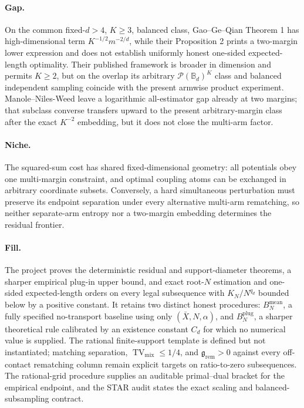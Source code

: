 \documentclass{article}
\begin{document}
\paragraph{Gap.} On the common fixed-\(d>4\), \(K\ge3\), balanced class, Gao--Ge--Qian Theorem 1 has high-dimensional term \(K^{-1/2}m^{-2/d}\), while their Proposition 2 prints a two-margin lower expression and does not establish uniformly honest one-sided expected-length optimality.  Their published framework is broader in dimension and permits \(K\ge2\), but on the overlap its arbitrary \(\mathcal P(\mathbb B_d)^K\) class and balanced independent sampling coincide with the present armwise product experiment.  Manole--Niles-Weed leave a logarithmic all-estimator gap already at two margins; that subclass converse transfers upward to the present arbitrary-margin class after the exact \(K^{-2}\) embedding, but it does not close the multi-arm factor.

\paragraph{Niche.} The squared-sum cost has shared fixed-dimensional geometry: all potentials obey one multi-margin constraint, and optimal coupling atoms can be exchanged in arbitrary coordinate subsets.  Conversely, a hard simultaneous perturbation must preserve its endpoint separation under every alternative multi-arm rematching, so neither separate-arm entropy nor a two-margin embedding determines the residual frontier.

\paragraph{Fill.} The project proves the deterministic residual and support-diameter theorems, a sharper empirical plug-in upper bound, and exact root-\(N\) estimation and one-sided expected-length orders on every legal subsequence with \(K_N/N^{q_d}\) bounded below by a positive constant.  It retains two distinct honest procedures: \(B_N^{\mathrm{mean}}\), a fully specified no-transport baseline using only \((\bar X,N,\alpha)\), and \(B_N^{\mathrm{plug}}\), a sharper theoretical rule calibrated by an existence constant \(C_d\) for which no numerical value is supplied.  The rational finite-support template is defined but not instantiated; matching separation, \(\operatorname{TV}_{\mathrm{mix}}\le1/4\), and \(\mathfrak g_{\mathrm{rem}}>0\) against every off-contact rematching column remain explicit targets on ratio-to-zero subsequences.  The rational-grid procedure supplies an auditable primal--dual bracket for the empirical endpoint, and the STAR audit states the exact scaling and balanced-subsampling contract.
\end{document}
